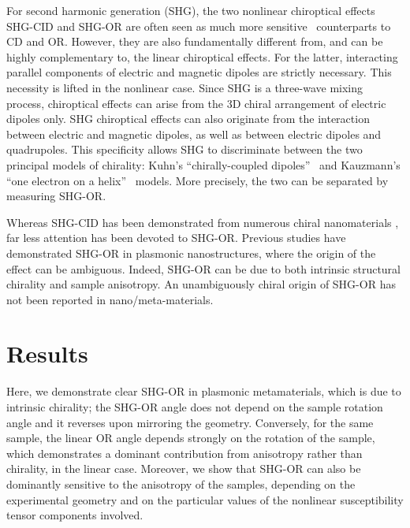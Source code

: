 For second harmonic generation (SHG), the two nonlinear chiroptical effects SHG-CID and SHG-OR are often seen as much more sensitive~\cite{Petralli-Mallow1993} counterparts to CD and OR. However, they are also fundamentally different from, and can be highly complementary to, the linear chiroptical effects. For the latter, interacting parallel components of electric and magnetic dipoles are strictly necessary. This necessity is lifted in the nonlinear case. Since SHG is a three-wave mixing process, chiroptical effects can arise from the 3D chiral arrangement of electric dipoles only.\cite{verbiest2009second} 
SHG chiroptical effects can also originate from the interaction between electric and magnetic dipoles, as well as between electric dipoles and quadrupoles. This specificity allows SHG to discriminate between the two principal models of chirality:\cite{Fischer2005a} Kuhn's ``chirally-coupled dipoles''~\cite{Kuhn1930} and Kauzmann's ``one electron on a helix''~\cite{Kauzmann1957a} models. More precisely, the two can be separated by measuring SHG-OR. 

Whereas SHG-CID has been demonstrated from numerous chiral nanomaterials \cite{Hooper2017, Mamonov2017, Chen2016, Kolkowski2015, Belardini2014}, far less attention has been devoted to SHG-OR. Previous studies have demonstrated SHG-OR in plasmonic nanostructures, where the origin of the effect can be ambiguous.\cite{Romain2017, Ren2012a, Mamonov2012} Indeed, SHG-OR can be due to both intrinsic structural chirality and sample anisotropy. An unambiguously chiral origin of SHG-OR has not been reported in nano/meta-materials. 

\section{Results}\label{sec:results:OAinPlanarNanohelices:results}
Here, we demonstrate clear SHG-OR in plasmonic metamaterials, which is due to intrinsic chirality; the SHG-OR angle does not depend on the sample rotation angle and it reverses upon mirroring the geometry. Conversely, for the same sample, the linear OR angle depends strongly on the rotation of the sample, which demonstrates a dominant contribution from anisotropy rather than chirality, in the linear case. Moreover, we show that SHG-OR can also be dominantly sensitive to the anisotropy of the samples, depending on the experimental geometry and on the particular values of the nonlinear susceptibility tensor components involved. 

